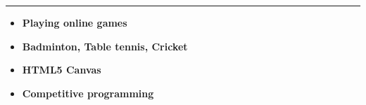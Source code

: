 \documentclass[a4paper,10pt]{article}
\newlength{\cvcolumngapwidth}
\newlength{\cvleftcolumnwidth}
\newlength{\cvrightcolumnwidth}
\newcommand{\cvsectionstyle}[1]{{\normalsize\cvsectionfont\textcolor{cvsectioncolor}{#1}}}
\newcommand{\cvheadingstyle}[1]{{\normalsize\cvheadingfont\textcolor{cvheadingcolor}{#1}}}
\newlength{\cvafteritemskipamount}
\newlength{\cvaftersectionskipamount}
\newlength{\cvbetweensectionandheadingextraskipamount}
\newlength{\cvparskip}
\newcommand{\cvsection}[1]{
    \begin{minipage}[t]{\cvleftcolumnwidth}
        \raggedleft\cvsectionstyle{#1}
    \end{minipage}%
    \hspace{\cvcolumngapwidth}%
    \begin{minipage}[t]{\cvrightcolumnwidth}
        \textcolor{cvrulecolor}{\rule{\cvrightcolumnwidth}{0.3mm}}
    \end{minipage}

    \vspace{\cvaftersectionskipamount}
}
\newcommand{\cvitem}[2]{
    \begin{minipage}[t]{\cvleftcolumnwidth}
        \raggedleft #1
    \end{minipage}%
    \hspace{\cvcolumngapwidth}%
    \begin{minipage}[t]{\cvrightcolumnwidth}
        \setlength{\parskip}{\cvparskip} #2
    \end{minipage}

    \vspace{\cvafteritemskipamount}
}
\begin{document}

\cvsection{EXTRACURRICULAR ACTIVITIES}

\vspace{\cvbetweensectionandheadingextraskipamount}

\cvitem{
    \cvheadingstyle{}
}{
    
    \begin{itemize}
        \item \textbf{Playing online games}
	\item \textbf{Badminton, Table tennis, Cricket}
        \item \textbf{HTML5 Canvas}
        \item \textbf{Competitive programming}
        
    \end{itemize}

    
}
\end{document}
